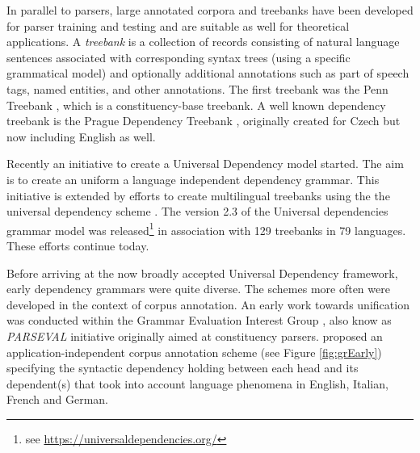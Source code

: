     In parallel to parsers, large annotated corpora and treebanks have been developed for parser training and testing and are suitable as well for theoretical applications. A \textit{treebank} is a collection of records consisting of natural language sentences associated with corresponding syntax trees (using a specific grammatical model) and optionally additional annotations such as part of speech tags, named entities, and other annotations. The first treebank was the Penn Treebank \citep{Santorini1990,Marcus1993}, which is a constituency-base treebank. A well known dependency treebank is the Prague Dependency Treebank \citep{hajic2001prague,Bohmova2003}, originally created for Czech but now including English as well. 
    
    Recently an initiative to create a Universal Dependency model \citep{nivre2015} started. The aim is to create an uniform a language independent dependency grammar. This initiative is extended by efforts to create multilingual treebanks using the the universal dependency scheme \citep{Nivre2016ud}. The version 2.3 of the Universal dependencies grammar model was released\footnote{see \url{https://universaldependencies.org/}} in association with 129 treebanks in 79 languages. These efforts continue today. 

    Before arriving at the now broadly accepted Universal Dependency framework, early dependency grammars were quite diverse. The schemes more often were developed in the context of corpus annotation. An early work \citep{carroll1998parser} towards unification was conducted within the Grammar Evaluation Interest Group \citep{Harrison1991}, also know as \textit{PARSEVAL} initiative originally aimed at constituency parsers. \citet{Carroll1999} proposed an application-independent corpus annotation scheme (see Figure \ref{fig:grEarly}) specifying the syntactic dependency holding between each head and its dependent(s) that took into account language phenomena in English, Italian, French and German. 


